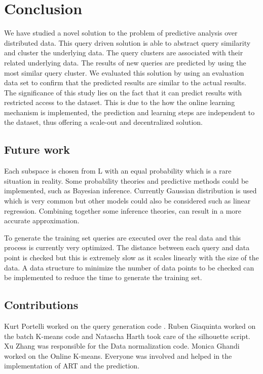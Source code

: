 \documentclass{lmproj}
\begin{document}
\chapter{Conclusion}
We have studied a novel solution to the problem of predictive analysis over distributed data. This query driven solution is able to abstract query similarity and cluster the underlying data. The query clusters are associated with their related underlying data. The results of new queries are predicted by using the most similar query cluster. We evaluated this solution by using an evaluation data set to confirm that the predicted results are similar to the actual results. The significance of this study lies on the fact that it can predict results with restricted access to the dataset. This is due to the how the online learning mechanism is implemented, the prediction and learning steps are independent to the dataset, thus offering a scale-out and decentralized solution. 

\section{Future work}

Each subspace is chosen from L with an equal probability which is a rare situation in reality. Some probability theories and predictive methods could be implemented, such as Bayesian inference. Currently Gaussian distribution is used which is very common but other models could also be considered such as linear regression. Combining together some inference theories, can result in a more accurate approximation.

To generate the training set queries are executed over the real data and this process is currently very optimized. The distance between each query and data point is checked but this is extremely slow as it scales linearly with the size of the data. A data structure to minimize the number of data points to be checked can be implemented to reduce the time to generate the training set.

\section{Contributions}
Kurt Portelli worked on the 
query generation code 
. Ruben Giaquinta worked on the batch K-means code and %
Natascha Harth took care of the 
silhouette script. Xu Zhang was responsible for the 
Data normalization code. Monica Ghandi worked on the Online K-means. Everyone was involved and helped in the implementation of ART and the prediction. %


\end{document}

